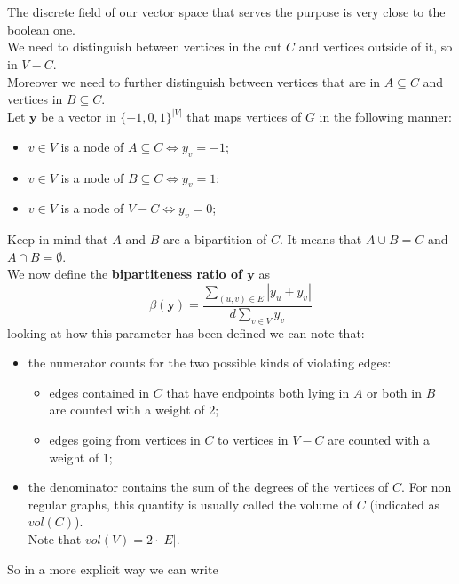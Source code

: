 \\
\\
The discrete field of our vector space that serves the purpose  is very close to the boolean one.\\
We need to distinguish between vertices in the cut $ C $ and vertices outside of it, so in $ V-C $.\\
Moreover we need to further distinguish between vertices that are in $ A \subseteq C $ and vertices in $ B \subseteq C $.\\
Let $ \mathbf{y} $ be a vector in $ \{-1,0,1\}^{|V|} $ that maps vertices of $ G $ in the following manner: 
\begin{itemize}
\item $ v \in V $ is a node of $ A \subseteq C \iff y_v = -1 $;
\item $ v \in V $ is a node of $ B \subseteq C \iff y_v = 1 $;
\item $ v \in V $ is a node of $ V - C  \iff y_v = 0 $;
\end{itemize}
Keep in mind that $ A $ and $ B $ are a bipartition of $ C $. It means that $ A \cup B = C $ and $ A \cap B = \emptyset $. \\
We now define the \textbf{bipartiteness ratio of $ \mathbf{y} $} as
\[ \beta(\mathbf{y}) = \frac{\sum_{(u,v)\in E} |y_u+y_v|}{d \sum_{v \in V} y_v } \]
looking at how this parameter has been defined we can note that:
\begin{itemize}
\item the numerator counts for the two possible kinds of violating edges:
\begin{itemize}
\item edges contained in $ C $ that have endpoints both lying in $ A $ or both in $ B $ are counted with a weight of 2;
\item edges going from vertices in $ C $ to vertices in $ V-C $ are counted with a weight of 1;
\end{itemize}  
\item the denominator contains the sum of the degrees of the vertices of $ C $. For non regular graphs, this quantity is usually called the volume of $ C $ (indicated as $ vol(C) $).\\ Note that $ vol(V) = 2\cdot|E| $.
\end{itemize}
So in a more explicit way we can write
